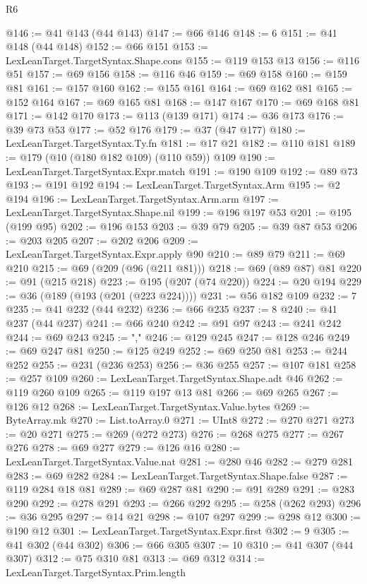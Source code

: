 \begin{lexlean}{R6}
\begin{coremodule}
@146 := @41 @143 (@44 @143)
@147 := @66 @146
@148 := 6
@151 := @41 @148 (@44 @148)
@152 := @66 @151
@153 := LexLeanTarget.TargetSyntax.Shape.cons
@155 := @119 @153 @13
@156 := @116 @51
@157 := @69 @156
@158 := @116 @46
@159 := @69 @158
@160 := @159 @81
@161 := @157 @160
@162 := @155 @161
@164 := @69 @162 @81
@165 := @152 @164
@167 := @69 @165 @81
@168 := @147 @167
@170 := @69 @168 @81
@171 := @142 @170
@173 := @113 (@139 @171)
@174 := @36 @173
@176 := @39 @73 @53
@177 := @52 @176
@179 := @37 (@47 @177)
@180 := LexLeanTarget.TargetSyntax.Ty.fn
@181 := @17 @21
@182 := @110 @181
@189 := @179 (@10 (@180 @182 @109) (@110 @59)) @109
@190 := LexLeanTarget.TargetSyntax.Expr.match
@191 := @190 @109
@192 := @89 @73
@193 := @191 @192
@194 := LexLeanTarget.TargetSyntax.Arm
@195 := @2 @194
@196 := LexLeanTarget.TargetSyntax.Arm.arm
@197 := LexLeanTarget.TargetSyntax.Shape.nil
@199 := @196 @197 @53
@201 := @195 (@199 @95)
@202 := @196 @153
@203 := @39 @79
@205 := @39 @87 @53
@206 := @203 @205
@207 := @202 @206
@209 := LexLeanTarget.TargetSyntax.Expr.apply @90
@210 := @89 @79
@211 := @69 @210
@215 := @69 (@209 (@96 (@211 @81)))
@218 := @69 (@89 @87) @81
@220 := @91 (@215 @218)
@223 := @195 (@207 (@74 @220))
@224 := @20 @194
@229 := @36 (@189 (@193 (@201 (@223 @224))))
@231 := @56 @182 @109
@232 := 7
@235 := @41 @232 (@44 @232)
@236 := @66 @235
@237 := 8
@240 := @41 @237 (@44 @237)
@241 := @66 @240
@242 := @91 @97
@243 := @241 @242
@244 := @69 @243
@245 := ","
@246 := @129 @245
@247 := @128 @246
@249 := @69 @247 @81
@250 := @125 @249
@252 := @69 @250 @81
@253 := @244 @252
@255 := @231 (@236 @253)
@256 := @36 @255
@257 := @107 @181
@258 := @257 @109
@260 := LexLeanTarget.TargetSyntax.Shape.adt @46
@262 := @119 @260 @109
@265 := @119 @197 @13 @81
@266 := @69 @265
@267 := @126 @12
@268 := LexLeanTarget.TargetSyntax.Value.bytes
@269 := ByteArray.mk
@270 := List.toArray.{0}
@271 := UInt8
@272 := @270 @271
@273 := @20 @271
@275 := @269 (@272 @273)
@276 := @268 @275
@277 := @267 @276
@278 := @69 @277
@279 := @126 @16
@280 := LexLeanTarget.TargetSyntax.Value.nat
@281 := @280 @46
@282 := @279 @281
@283 := @69 @282
@284 := LexLeanTarget.TargetSyntax.Shape.false
@287 := @119 @284 @18 @81
@289 := @69 @287 @81
@290 := @91 @289
@291 := @283 @290
@292 := @278 @291
@293 := @266 @292
@295 := @258 (@262 @293)
@296 := @36 @295
@297 := @14 @21
@298 := @107 @297
@299 := @298 @12
@300 := @190 @12
@301 := LexLeanTarget.TargetSyntax.Expr.first
@302 := 9
@305 := @41 @302 (@44 @302)
@306 := @66 @305
@307 := 10
@310 := @41 @307 (@44 @307)
@312 := @75 @310 @81
@313 := @69 @312
@314 := LexLeanTarget.TargetSyntax.Prim.length

\end{coremodule}
\end{lexlean}

